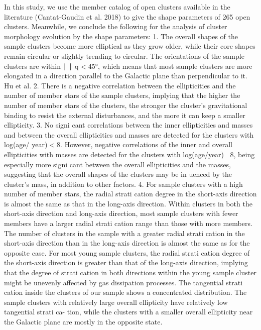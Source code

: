 \documentclass[../main.tex]{subfiles}
\begin{document}
{In this study, we use the member catalog of open clusters
available in the literature (Cantat-Gaudin et al. 2018) to give
the shape parameters of 265 open clusters. Meanwhile, we
conclude the following for the analysis of cluster morphology
evolution by the shape parameters:
1. The overall shapes of the sample clusters become more
elliptical as they grow older, while their core shapes remain
circular or slightly trending to circular. The orientations of
the sample clusters are within ∣ ∣ q <45°, which means that
most sample clusters are more elongated in a direction
parallel to the Galactic plane than perpendicular to it.
Hu et al.
2. There is a negative correlation between the ellipticities
and the number of member stars of the sample clusters,
implying that the higher the number of member stars of
the clusters, the stronger the cluster’s gravitational
binding to resist the external disturbances, and the more
it can keep a smaller ellipticity.
3. No signi cant correlations between the inner ellipticities
and masses and between the overall ellipticities and
masses are detected for the clusters with log(age/
year)<8. However, negative correlations of the inner
and overall ellipticities with masses are detected for the
clusters with log(age/year) 8, being especially more
signi cant between the overall ellipticities and the
masses, suggesting that the overall shapes of the clusters
may be in uenced by the cluster’s mass, in addition to
other factors.
4. For sample clusters with a high number of member stars,
the radial strati cation degree in the short-axis direction is
almost the same as that in the long-axis direction. Within
clusters in both the short-axis direction and long-axis
direction, most sample clusters with fewer members have
a larger radial strati cation range than those with more
members. The number of clusters in the sample with a
greater radial strati cation in the short-axis direction than
in the long-axis direction is almost the same as for the
opposite case. For most young sample clusters, the radial
strati cation degree of the short-axis direction is greater
than that of the long-axis direction, implying that the
degree of strati cation in both directions within the
young sample cluster might be unevenly affected by gas
dissipation processes. The tangential strati cation inside
the clusters of our sample shows a concentrated
distribution. The sample clusters with relatively large
overall ellipticity have relatively low tangential strati ca-
tion, while the clusters with a smaller overall ellipticity
near the Galactic plane are mostly in the opposite state.
}
\end{document}
